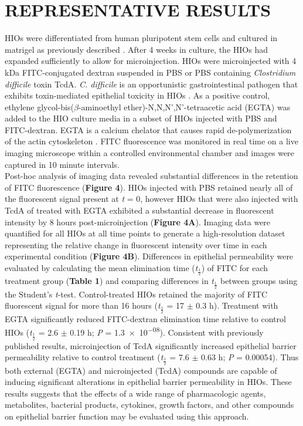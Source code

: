 \documentclass[11pt]{article}
\begin{document}
\section*{REPRESENTATIVE RESULTS}
HIOs were differentiated from human pluripotent stem cells and cultured in matrigel as previously described \supercite{Spence:2011,McCracken:2011}. After 4 weeks in culture, the HIOs had expanded sufficiently to allow for microinjection. HIOs were microinjected with 4 kDa FITC-conjugated dextran suspended in PBS or PBS containing \emph{Clostridium difficile} toxin TcdA. \emph{C. difficile} is an opportunistic gastrointestinal pathogen that exhibits toxin-mediated epithelial toxicity in HIOs \supercite{Leslie:2015}. As a positive control, ethylene glycol-bis(\(\beta\)-aminoethyl ether)-N,N,N',N'-tetraacetic acid (EGTA) was added to the HIO culture media in a subset of HIOs injected with PBS and FITC-dextran. EGTA is a calcium chelator that causes rapid de-polymerization of the actin cytoskeleton \supercite{Selden:1983}. FITC fluorescence was monitored in real time on a live imaging microscope within a controlled environmental chamber and images were captured in 10 minute intervals.\\
Post-hoc analysis of imaging data revealed substantial differences in the retention of FITC fluorescence (\textbf{Figure 4}). HIOs injected with PBS retained nearly all of the fluorescent signal present at \emph{t} = 0, however HIOs that were also injected with TcdA of treated with EGTA exhibited a substantial decrease in fluorescent intensity by 8 hours post-microinjection (\textbf{Figure 4A}). Imaging data were quantified for all HIOs at all time points to generate a high-resolution dataset representing the relative change in fluorescent intensity over time in each experimental condition (\textbf{Figure 4B}). Differences in epithelial permeability were evaluated by calculating the mean elimination time (\textit{t}\(_\frac{1}{2}\)) of FITC for each treatment group (\textbf{Table 1}) and comparing differences in \textit{t}\(_\frac{1}{2}\) between groups using the Student's \emph{t}-test. Control-treated HIOs retained the majority of FITC fluorescent signal for more than 16 hours (\textit{t}\(_\frac{1}{2}\) = 17 \(\pm\) 0.3 h). Treatment with EGTA significantly reduced FITC-dextran elimination time relative to control HIOs (\textit{t}\(_\frac{1}{2}\) = 2.6 \(\pm\) 0.19 h; \emph{P} = \num{1.3e-08}). Consistent with previously published results\supercite{Leslie:2015}, microinjection of TcdA significantly increased epithelial barrier permeability relative to control treatment (\textit{t}\(_\frac{1}{2}\) = 7.6 \(\pm\) 0.63 h; \emph{P} = \num{0.00054}). Thus both external (EGTA) and microinjected (TcdA) compounds are capable of inducing significant alterations in epithelial barrier permeability in HIOs. These results suggests that the effects of a wide range of pharmacologic agents, metabolites, bacterial products, cytokines, growth factors, and other compounds on epithelial barrier function may be evaluated using this approach.\\
\end{document}
